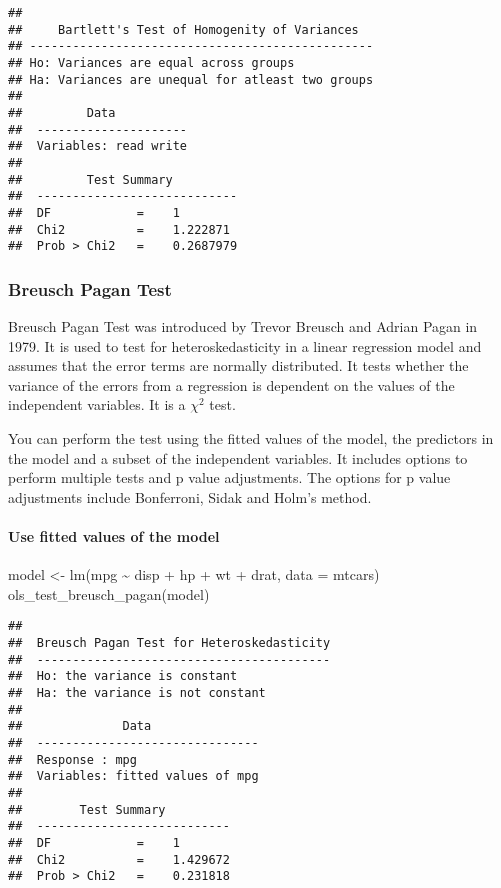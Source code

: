 \documentclass[
]{article}
\newenvironment{Shaded}{\begin{snugshade}}{\end{snugshade}}
\newcommand{\AttributeTok}[1]{\textcolor[rgb]{0.77,0.63,0.00}{#1}}
\newcommand{\FunctionTok}[1]{\textcolor[rgb]{0.00,0.00,0.00}{#1}}
\newcommand{\NormalTok}[1]{#1}
\newcommand{\OtherTok}[1]{\textcolor[rgb]{0.56,0.35,0.01}{#1}}
\newcommand{\SpecialCharTok}[1]{\textcolor[rgb]{0.00,0.00,0.00}{#1}}
\begin{document}
\begin{verbatim}
## 
##     Bartlett's Test of Homogenity of Variances    
## ------------------------------------------------
## Ho: Variances are equal across groups
## Ha: Variances are unequal for atleast two groups
## 
##         Data          
##  ---------------------
##  Variables: read write 
## 
##         Test Summary         
##  ----------------------------
##  DF            =    1 
##  Chi2          =    1.222871 
##  Prob > Chi2   =    0.2687979
\end{verbatim}

\hypertarget{breusch-pagan-test-1}{%
\subsubsection{Breusch Pagan Test}\label{breusch-pagan-test-1}}

Breusch Pagan Test was introduced by Trevor Breusch and Adrian Pagan in
1979. It is used to test for heteroskedasticity in a linear regression
model and assumes that the error terms are normally distributed. It
tests whether the variance of the errors from a regression is dependent
on the values of the independent variables. It is a \(\chi^{2}\) test.

You can perform the test using the fitted values of the model, the
predictors in the model and a subset of the independent variables. It
includes options to perform multiple tests and p value adjustments. The
options for p value adjustments include Bonferroni, Sidak and Holm's
method.

\hypertarget{use-fitted-values-of-the-model}{%
\paragraph{Use fitted values of the
model}\label{use-fitted-values-of-the-model}}

\begin{Shaded}
\begin{Highlighting}[]
\NormalTok{model }\OtherTok{\textless{}{-}} \FunctionTok{lm}\NormalTok{(mpg }\SpecialCharTok{\textasciitilde{}}\NormalTok{ disp }\SpecialCharTok{+}\NormalTok{ hp }\SpecialCharTok{+}\NormalTok{ wt }\SpecialCharTok{+}\NormalTok{ drat, }\AttributeTok{data =}\NormalTok{ mtcars)}
\FunctionTok{ols\_test\_breusch\_pagan}\NormalTok{(model)}
\end{Highlighting}
\end{Shaded}

\begin{verbatim}
## 
##  Breusch Pagan Test for Heteroskedasticity
##  -----------------------------------------
##  Ho: the variance is constant            
##  Ha: the variance is not constant        
## 
##              Data               
##  -------------------------------
##  Response : mpg 
##  Variables: fitted values of mpg 
## 
##        Test Summary         
##  ---------------------------
##  DF            =    1 
##  Chi2          =    1.429672 
##  Prob > Chi2   =    0.231818
\end{verbatim}
\end{document}
